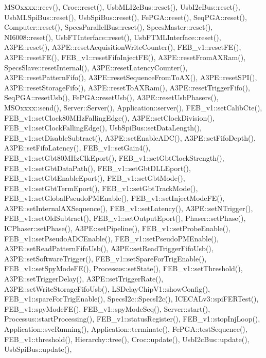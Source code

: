 M\+S\+Oxxxx\+::recv(), Croc\+::reset(), Usb\+M\+L\+I2c\+Bus\+::reset(), Usb\+I2c\+Bus\+::reset(), Usb\+M\+L\+Spi\+Bus\+::reset(), Usb\+Spi\+Bus\+::reset(), Fe\+P\+G\+A\+::reset(), Seq\+P\+G\+A\+::reset(), Computer\+::reset(), Specs\+Parallel\+Bus\+::reset(), Specs\+Master\+::reset(), N\+I6008\+::reset(), Usb\+F\+T\+Interface\+::reset(), Usb\+F\+T\+M\+L\+Interface\+::reset(), A3\+P\+E\+::reset(), A3\+P\+E\+::reset\+Acquisition\+Write\+Counter(), F\+E\+B\+\_\+v1\+::reset\+F\+E(), A3\+P\+E\+::reset\+F\+E(), F\+E\+B\+\_\+v1\+::reset\+Fifo\+Inject\+F\+E(), A3\+P\+E\+::reset\+From\+A\+X\+Ram(), Specs\+Slave\+::reset\+Internal(), A3\+P\+E\+::reset\+Latency\+Counter(), A3\+P\+E\+::reset\+Pattern\+Fifo(), A3\+P\+E\+::reset\+Sequence\+From\+To\+A\+X(), A3\+P\+E\+::reset\+S\+P\+I(), A3\+P\+E\+::reset\+Storage\+Fifo(), A3\+P\+E\+::reset\+To\+A\+X\+Ram(), A3\+P\+E\+::reset\+Trigger\+Fifo(), Seq\+P\+G\+A\+::reset\+Usb(), Fe\+P\+G\+A\+::reset\+Usb(), A3\+P\+E\+::reset\+Usb\+Phasers(), M\+S\+Oxxxx\+::send(), Server\+::\+Server(), Application\+::server(), F\+E\+B\+\_\+v1\+::set\+Calib\+Cte(), F\+E\+B\+\_\+v1\+::set\+Clock80\+M\+Hz\+Falling\+Edge(), A3\+P\+E\+::set\+Clock\+Division(), F\+E\+B\+\_\+v1\+::set\+Clock\+Falling\+Edge(), Usb\+Spi\+Bus\+::set\+Data\+Length(), F\+E\+B\+\_\+v1\+::set\+Disable\+Subtract(), A3\+P\+E\+::set\+Enable\+A\+D\+C(), A3\+P\+E\+::set\+Fifo\+Depth(), A3\+P\+E\+::set\+Fifo\+Latency(), F\+E\+B\+\_\+v1\+::set\+Gain4(), F\+E\+B\+\_\+v1\+::set\+Gbt80\+M\+Hz\+Clk\+Eport(), F\+E\+B\+\_\+v1\+::set\+Gbt\+Clock\+Strength(), F\+E\+B\+\_\+v1\+::set\+Gbt\+Data\+Path(), F\+E\+B\+\_\+v1\+::set\+Gbt\+D\+L\+L\+Eport(), F\+E\+B\+\_\+v1\+::set\+Gbt\+Enable\+Eport(), F\+E\+B\+\_\+v1\+::set\+Gbt\+Mode(), F\+E\+B\+\_\+v1\+::set\+Gbt\+Term\+Eport(), F\+E\+B\+\_\+v1\+::set\+Gbt\+Track\+Mode(), F\+E\+B\+\_\+v1\+::set\+Global\+Pseudo\+P\+M\+Enable(), F\+E\+B\+\_\+v1\+::set\+Inject\+Mode\+F\+E(), A3\+P\+E\+::set\+Internal\+A\+X\+Sequence(), F\+E\+B\+\_\+v1\+::set\+Latency(), A3\+P\+E\+::set\+N\+Trigger(), F\+E\+B\+\_\+v1\+::set\+Old\+Subtract(), F\+E\+B\+\_\+v1\+::set\+Output\+Eport(), Phaser\+::set\+Phase(), I\+C\+Phaser\+::set\+Phase(), A3\+P\+E\+::set\+Pipeline(), F\+E\+B\+\_\+v1\+::set\+Probe\+Enable(), F\+E\+B\+\_\+v1\+::set\+Pseudo\+A\+D\+C\+Enable(), F\+E\+B\+\_\+v1\+::set\+Pseudo\+P\+M\+Enable(), A3\+P\+E\+::set\+Read\+Pattern\+Fifo\+Usb(), A3\+P\+E\+::set\+Read\+Trigger\+Fifo\+Usb(), A3\+P\+E\+::set\+Software\+Trigger(), F\+E\+B\+\_\+v1\+::set\+Spare\+For\+Trig\+Enable(), F\+E\+B\+\_\+v1\+::set\+Spy\+Mode\+F\+E(), Processus\+::set\+State(), F\+E\+B\+\_\+v1\+::set\+Threshold(), A3\+P\+E\+::set\+Trigger\+Delay(), A3\+P\+E\+::set\+Trigger\+Rate(), A3\+P\+E\+::set\+Write\+Storage\+Fifo\+Usb(), L\+S\+Delay\+Chip\+V1\+::show\+Config(), F\+E\+B\+\_\+v1\+::spare\+For\+Trig\+Enable(), Specs\+I2c\+::\+Specs\+I2c(), I\+C\+E\+C\+A\+Lv3\+::spi\+F\+E\+R\+Test(), F\+E\+B\+\_\+v1\+::spy\+Mode\+F\+E(), F\+E\+B\+\_\+v1\+::spy\+Mode\+Seq(), Server\+::start(), Processus\+::start\+Processing(), F\+E\+B\+\_\+v1\+::status\+Register(), F\+E\+B\+\_\+v1\+::stop\+Inj\+Loop(), Application\+::svc\+Running(), Application\+::terminate(), Fe\+P\+G\+A\+::test\+Sequence(), F\+E\+B\+\_\+v1\+::threshold(), Hierarchy\+::tree(), Croc\+::update(), Usb\+I2c\+Bus\+::update(), Usb\+Spi\+Bus\+::update(), 